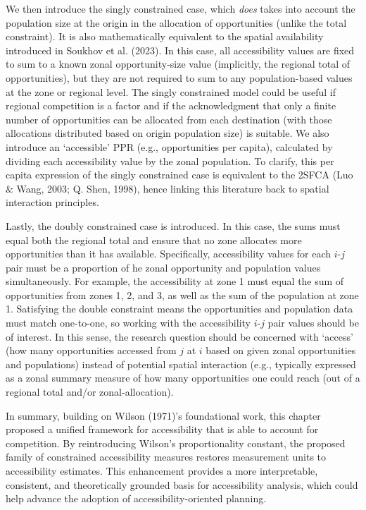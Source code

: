 \documentclass[
11pt, %
oneside, %
english, %
singlespacing, %
]{macthesis} %
\begin{document}
We then introduce the singly constrained case, which \emph{does} takes into account the population size at the origin in the allocation of opportunities (unlike the total constraint). It is also mathematically equivalent to the spatial availability introduced in Soukhov et al. (2023). In this case, all accessibility values are fixed to sum to a known zonal opportunity-size value (implicitly, the regional total of opportunities), but they are not required to sum to any population-based values at the zone or regional level. The singly constrained model could be useful if regional competition is a factor and if the acknowledgment that only a finite number of opportunities can be allocated from each destination (with those allocations distributed based on origin population size) is suitable. We also introduce an `accessible' PPR (e.g., opportunities per capita), calculated by dividing each accessibility value by the zonal population. To clarify, this per capita expression of the singly constrained case is equivalent to the 2SFCA (Luo \& Wang, 2003; Q. Shen, 1998), hence linking this literature back to spatial interaction principles.

Lastly, the doubly constrained case is introduced. In this case, the sums must equal both the regional total and ensure that no zone allocates more opportunities than it has available. Specifically, accessibility values for each \(i\)-\(j\) pair must be a proportion of he zonal opportunity and population values simultaneously. For example, the accessibility at zone 1 must equal the sum of opportunities from zones 1, 2, and 3, as well as the sum of the population at zone 1. Satisfying the double constraint means the opportunities and population data must match one-to-one, so working with the accessibility \(i\)-\(j\) pair values should be of interest. In this sense, the research question should be concerned with `access' (how many opportunities accessed from \(j\) at \(i\) based on given zonal opportunities and populations) instead of potential spatial interaction (e.g., typically expressed as a zonal summary measure of how many opportunities one could reach (out of a regional total and/or zonal-allocation).

In summary, building on Wilson (1971)'s foundational work, this chapter proposed a unified framework for accessibility that is able to account for competition. By reintroducing Wilson's proportionality constant, the proposed family of constrained accessibility measures restores measurement units to accessibility estimates. This enhancement provides a more interpretable, consistent, and theoretically grounded basis for accessibility analysis, which could help advance the adoption of accessibility-oriented planning.
\end{document}
